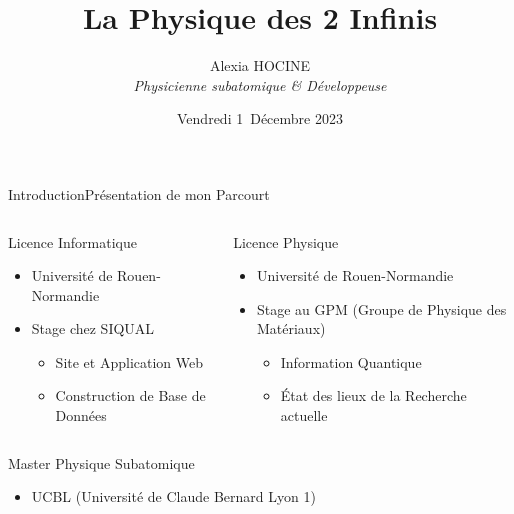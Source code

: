 \documentclass[handout,8pt]{beamer} %
\title{La Physique des 2 Infinis}
\author[A. Hocine]{Alexia HOCINE\\ \textit{Physicienne subatomique \& Développeuse}}
\institute[LVA]{Les Vendredis de l'Astronomie}
\date[2023]{Vendredi 1\ier\ Décembre 2023}
\begin{document}

\begin{frame}
	\titlepage
\end{frame}


\begin{frame}{Introduction}{Présentation de mon Parcourt}

	\pause
	\begin{columns}
		\begin{column}{0.45\textwidth}
			\begin{block}{Licence Informatique}
				\begin{itemize}
					\item Université de Rouen-Normandie
					\item Stage chez SIQUAL
					\begin{itemize}
						\item Site et Application Web
						\item Construction de Base de Données
					\end{itemize}
				\end{itemize}
			\end{block}
		\end{column}
		\pause
		\begin{column}{0.45\textwidth}
			\begin{block}{Licence Physique}
				\begin{itemize}
					\item Université de Rouen-Normandie
					\item Stage au GPM (Groupe de Physique des Matériaux)
					\begin{itemize}
						\item Information Quantique
						\item État des lieux de la Recherche actuelle
					\end{itemize}
				\end{itemize}
			\end{block}
		\end{column}
	\end{columns}
	\pause
	\begin{block}{Master Physique Subatomique}
		\begin{itemize}
			\item UCBL (Université de Claude Bernard Lyon 1)
		\end{itemize}
		\begin{columns}

\end{columns}
\end{block}
\end{frame}
\end{document}
